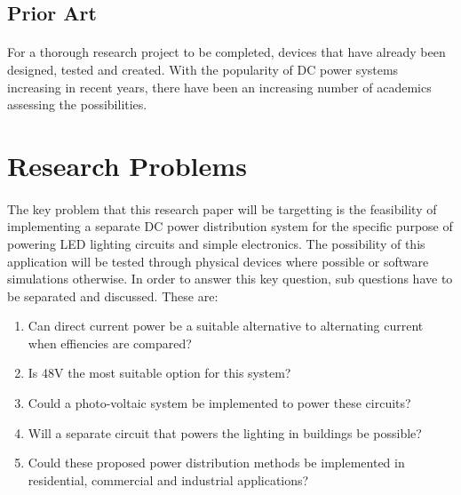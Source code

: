 \subsection{Prior Art}

\paragraph{}
For a thorough research project to be completed, devices that have already been designed, tested and created. With the popularity of DC power systems increasing in recent years, there have been an increasing number of academics assessing the possibilities.   

\newpage


\section{Research Problems}

\paragraph{}
The key problem that this research paper will be targetting is the feasibility of implementing a separate DC power distribution system for the specific purpose of powering LED lighting circuits and simple electronics. The possibility of this application will be tested through physical devices where possible or software simulations otherwise. In order to answer this key question, sub questions have to be separated and discussed. These are:

\begin{enumerate}
\itemsep-0.5em 
\item Can direct current power be a suitable alternative to alternating current when effiencies are compared?
\item Is 48V the most suitable option for this system?
\item Could a photo-voltaic system be implemented to power these circuits?
\item Will a separate circuit that powers the lighting in buildings be possible?
\item Could these proposed power distribution methods be implemented in residential, commercial and industrial applications?
\end{enumerate} 

\newpage